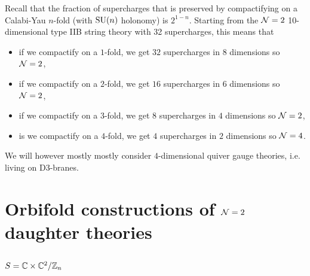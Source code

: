         Recall that the fraction of supercharges that is preserved by compactifying on a Calabi-Yau $n$-fold (with $\text{SU}(n)$ holonomy) is $2^{1-n}$. Starting from the $\mathcal{N}=2$ 10-dimensional type IIB string theory with 32 supercharges, this means that
        \begin{itemize}
            \item if we compactify on a $1$-fold, we get $32$ supercharges in $8$ dimensions so $\mathcal{N}=2$,
            \item if we compactify on a $2$-fold, we get $16$ supercharges in $6$ dimensions so $\mathcal{N}=2$,
            \item if we compactify on a $3$-fold, we get $8$ supercharges in $4$ dimensions so $\mathcal{N}=2$,
            \item is we compactify on a $4$-fold, we get $4$ supercharges in $2$ dimensions so $\mathcal{N}=4$.
        \end{itemize}

        We will however mostly mostly consider $4$-dimensional quiver gauge theories, i.e. living on D$3$-branes.
    

\section{Orbifold constructions of $\mathcal{N}=2$ daughter theories}


    \subsection{$S=\mathbb{C}\times\mathbb{C}^2/\mathbb{Z}_n$}

